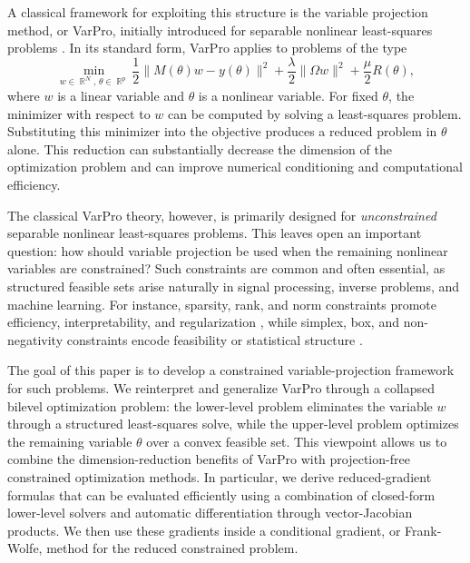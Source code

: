 \documentclass{article}
\DeclareMathOperator{\R}{\mathbb{R}}
\begin{document}
A classical framework for exploiting this structure is the variable projection method, or VarPro, initially introduced for separable nonlinear least-squares problems \cite{Gobub_Pereyra_varpro,Gobub_Veque_varpro,golub2003separable}. In its standard form, VarPro applies to problems of the type
\begin{equation}\label{eq:joint_formulation}
    \min_{w \in \R^{N},\,\theta \in \R^{p}} \frac12 \|M(\theta)w-y(\theta)\|^2 + \frac{\lambda}{2}\|\Omega w\|^2 + \frac{\mu}{2}R(\theta),
\end{equation}
where $w$ is a linear variable and $\theta$ is a nonlinear variable. For fixed $\theta$, the minimizer with respect to $w$ can be computed by solving a least-squares problem. Substituting this minimizer into the objective produces a reduced problem in $\theta$ alone. This reduction can substantially decrease the dimension of the optimization problem and can improve numerical conditioning and computational efficiency.


The classical VarPro theory, however, is primarily designed for \emph{unconstrained} separable nonlinear least-squares problems. This leaves open an important question: how should variable projection be used when the remaining nonlinear variables are constrained? Such constraints are common and often essential, as structured feasible sets arise naturally in signal processing, inverse problems, and machine learning. For instance, sparsity, rank, and norm constraints promote efficiency, interpretability, and regularization \cite{candes2011robust,donoho2006compressed,hastie2015statistical,recht2010guaranteed,tibshirani1996regression,zangrando2025debora}, while simplex, box, and non-negativity constraints encode feasibility or statistical structure \cite{carlini2017towards,duchi2008efficient,gillis2020nonnegative,jaggi2014equivalence,lim2016box}.

The goal of this paper is to develop a constrained variable-projection framework for such problems. We reinterpret and generalize VarPro through a collapsed bilevel optimization problem: the lower-level problem eliminates the variable $w$ through a structured least-squares solve, while the upper-level problem optimizes the remaining variable $\theta$ over a convex feasible set. This viewpoint allows us to combine
the dimension-reduction benefits of VarPro with projection-free constrained optimization methods. In particular, we derive reduced-gradient formulas that can be evaluated efficiently using a combination of closed-form lower-level solvers and automatic differentiation through vector-Jacobian products. We then use these gradients inside a conditional gradient, or Frank-Wolfe, method for the reduced constrained problem.
\end{document}
